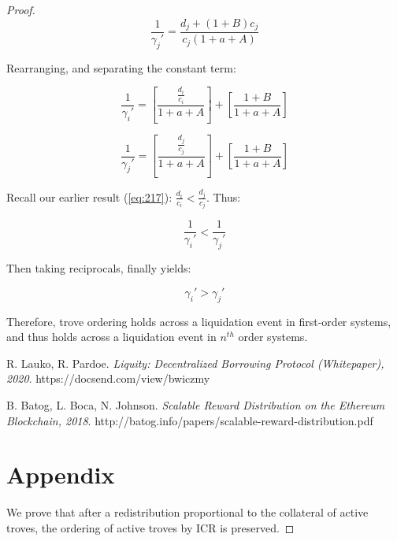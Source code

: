 \documentclass[reqno]{article}
\begin{document}
\begin{proof}
\begin{equation} 
    \frac{1}{\gamma_{j}'}=\frac{d_j+\left(1+B\right)c_j}{c_j\left(1+a+A\right)}
\end{equation}

\bigskip
Rearranging, and separating the constant term:

\begin{equation} 
    \frac{1}{\gamma_{i}'}=\left[\frac{\frac{d_i}{c_i}}{1+a+A}\right]+\left[\frac{1+B}{1+a+A}\right]
\end{equation}

\begin{equation} 
    \frac{1}{\gamma_{j}'}=\left[\frac{\frac{d_j}{c_j}}{1+a+A}\right]+\left[\frac{1+B}{1+a+A}\right]
\end{equation}

\bigskip
Recall our earlier result (\ref{eq:217}): $\frac{d_i}{c_i}<\frac{d_j}{c_j}$. Thus:

\begin{equation} 
    \frac{1}{\gamma_{i}'} < \frac{1}{\gamma_{j}'}
\end{equation}

\bigskip
Then taking reciprocals, finally yields:

\begin{equation} 
    \gamma_{i}' > \gamma_{j}'
\end{equation}

\bigskip
Therefore, trove ordering holds across a liquidation event in first-order systems, and thus holds across a liquidation event in $n^{th}$ order systems.

\bigskip

\begin{thebibliography}{9}

R. Lauko, R. Pardoe. 
\textit{Liquity: Decentralized Borrowing Protocol (Whitepaper), 2020}. 
https://docsend.com/view/bwiczmy

B. Batog, L. Boca, N. Johnson.
\textit{Scalable Reward Distribution on the Ethereum Blockchain, 2018}. 
http://batog.info/papers/scalable-reward-distribution.pdf


\end{thebibliography}

\pagebreak
\section{Appendix} \label{sec:appendix}
We prove that after a redistribution proportional to the collateral of active troves, the ordering of active troves by ICR is preserved. 


\end{proof}
\end{document}
